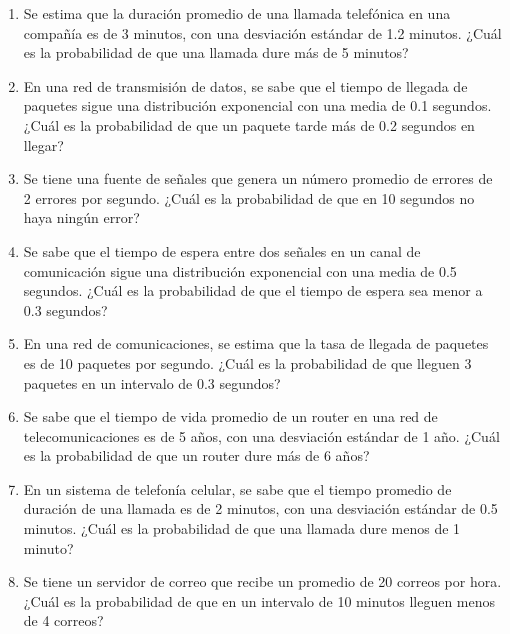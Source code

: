 \begin{Ejer}
\begin{enumerate}
    \item Se estima que la duración promedio de una llamada telefónica en una compañía es de 3 minutos, con una desviación estándar de 1.2 minutos. ¿Cuál es la probabilidad de que una llamada dure más de 5 minutos?

    \item En una red de transmisión de datos, se sabe que el tiempo de llegada de paquetes sigue una distribución exponencial con una media de 0.1 segundos. ¿Cuál es la probabilidad de que un paquete tarde más de 0.2 segundos en llegar?

    \item Se tiene una fuente de señales que genera un número promedio de errores de 2 errores por segundo. ¿Cuál es la probabilidad de que en 10 segundos no haya ningún error?

    \item Se sabe que el tiempo de espera entre dos señales en un canal de comunicación sigue una distribución exponencial con una media de 0.5 segundos. ¿Cuál es la probabilidad de que el tiempo de espera sea menor a 0.3 segundos?

    \item En una red de comunicaciones, se estima que la tasa de llegada de paquetes es de 10 paquetes por segundo. ¿Cuál es la probabilidad de que lleguen 3 paquetes en un intervalo de 0.3 segundos?

    \item Se sabe que el tiempo de vida promedio de un router en una red de telecomunicaciones es de 5 años, con una desviación estándar de 1 año. ¿Cuál es la probabilidad de que un router dure más de 6 años?

    \item En un sistema de telefonía celular, se sabe que el tiempo promedio de duración de una llamada es de 2 minutos, con una desviación estándar de 0.5 minutos. ¿Cuál es la probabilidad de que una llamada dure menos de 1 minuto?

    \item Se tiene un servidor de correo que recibe un promedio de 20 correos por hora. ¿Cuál es la probabilidad de que en un intervalo de 10 minutos lleguen menos de 4 correos?

\end{enumerate}
\end{Ejer} 


